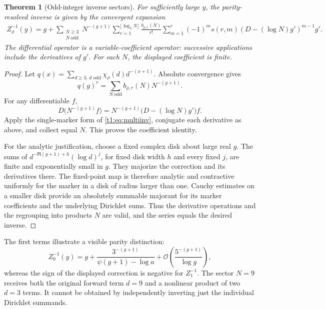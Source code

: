 \documentclass[11pt,openany]{book}
\numberwithin{equation}{chapter}
\theoremstyle{plain}
\newtheorem{theorem}{Theorem}[chapter]
\theoremstyle{definition}
\theoremstyle{remark}
\newcommand{\N}{\mathbb N}\newcommand{\R}{\mathbb R}\newcommand{\C}{\mathbb C}\newcommand{\Z}{\mathbb Z}
\newcommand{\OO}{\mathcal O}\newcommand{\bigO}{\mathcal O}
\begin{document}
\begin{theorem}[Odd-integer inverse sectors]\label{t1:thm:zigzaginverse}
For sufficiently large $y$, the parity-resolved inverse is given by the convergent expansion
\begin{align}
 Z_\rho^{-1}(y)=g+\sum_{\substack{N\ge3\\N\ \mathrm{odd}}}N^{-(g+1)}
 \sum_{r=1}^{\lfloor\log_3N\rfloor}\frac{b_{\rho,r}(N)}{r!}
 \sum_{m=1}^r(-1)^m s(r,m)
 \left(D-(\log N)g'\right)^{m-1}g'.
 \label{t1:eq:zigzaginverse}
\end{align}
The differential operator is a variable-coefficient operator: successive applications include the derivatives of $g'$. For each $N$, the displayed coefficient is finite.
\end{theorem}
\begin{proof}
Let $q(x)=\sum_{d\ge3,\,d\text{ odd}}\chi_\rho(d)d^{-(x+1)}$. Absolute convergence gives
\[
 q(g)^r=\sum_{N\ \mathrm{odd}}b_{\rho,r}(N)N^{-(g+1)}.
\]
For any differentiable $f$,
\[
 D\bigl(N^{-(g+1)}f\bigr)
 =N^{-(g+1)}\bigl(D-(\log N)g'\bigr)f.
\]
Apply the single-marker form of \eqref{t1:eq:multiinv}, conjugate each derivative as above, and collect equal $N$. This proves the coefficient identity.

For the analytic justification, choose a fixed complex disk about large real $g$. The sums of $d^{-\Re(g+1)+h}(\log d)^j$, for fixed disk width $h$ and every fixed $j$, are finite and exponentially small in $g$. They majorize the correction and its derivatives there. The fixed-point map is therefore analytic and contractive uniformly for the marker in a disk of radius larger than one. Cauchy estimates on a smaller disk provide an absolutely summable majorant for its marker coefficients and the underlying Dirichlet sums. Thus the derivative operations and the regrouping into products $N$ are valid, and the series equals the desired inverse.
\end{proof}

The first terms illustrate a visible parity distinction:
\begin{equation}
 Z_0^{-1}(y)=g+\frac{3^{-(g+1)}}{\psi(g+1)-\log a}
 +\OO\!\left(\frac{5^{-(g+1)}}{\log g}\right),
 \label{t1:eq:zigzagevenfirst}
\end{equation}
whereas the sign of the displayed correction is negative for $Z_1^{-1}$. The sector $N=9$ receives both the original forward term $d=9$ and a nonlinear product of two $d=3$ terms. It cannot be obtained by independently inverting just the individual Dirichlet summands.
\end{document}
